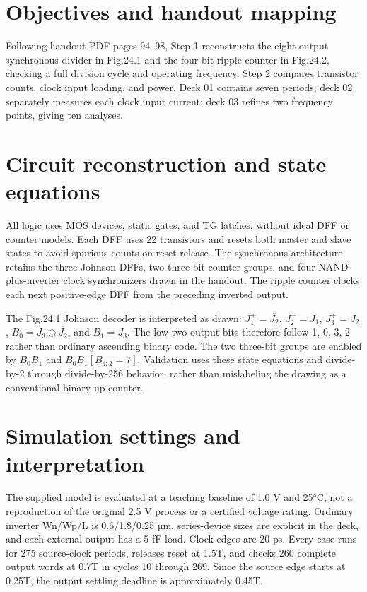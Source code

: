 \section{Objectives and handout mapping}

Following handout PDF pages 94--98, Step 1 reconstructs the eight-output synchronous divider in Fig.24.1 and the four-bit ripple counter in Fig.24.2, checking a full division cycle and operating frequency. Step 2 compares transistor counts, clock input loading, and power. Deck 01 contains seven periods; deck 02 separately measures each clock input current; deck 03 refines two frequency points, giving ten analyses.

\section{Circuit reconstruction and state equations}

All logic uses MOS devices, static gates, and TG latches, without ideal DFF or counter models. Each DFF uses 22 transistors and resets both master and slave states to avoid spurious counts on reset release. The synchronous architecture retains the three Johnson DFFs, two three-bit counter groups, and four-NAND-plus-inverter clock synchronizers drawn in the handout. The ripple counter clocks each next positive-edge DFF from the preceding inverted output.

The Fig.24.1 Johnson decoder is interpreted as drawn: $J_1^+=\overline{J_2}$, $J_2^+=J_1$, $J_3^+=J_2$, $B_0=J_3\oplus\overline{J_2}$, and $B_1=J_3$. The low two output bits therefore follow 1, 0, 3, 2 rather than ordinary ascending binary code. The two three-bit groups are enabled by $B_0B_1$ and $B_0B_1[B_{4:2}=7]$. Validation uses these state equations and divide-by-2 through divide-by-256 behavior, rather than mislabeling the drawing as a conventional binary up-counter.

\section{Simulation settings and interpretation}

The supplied model is evaluated at a teaching baseline of 1.0 V and 25°C, not a reproduction of the original 2.5 V process or a certified voltage rating. Ordinary inverter Wn/Wp/L is 0.6/1.8/0.25 µm, series-device sizes are explicit in the deck, and each external output has a 5 fF load. Clock edges are 20 ps. Every case runs for 275 source-clock periods, releases reset at 1.5T, and checks 260 complete output words at 0.7T in cycles 10 through 269. Since the source edge starts at 0.25T, the output settling deadline is approximately 0.45T.

